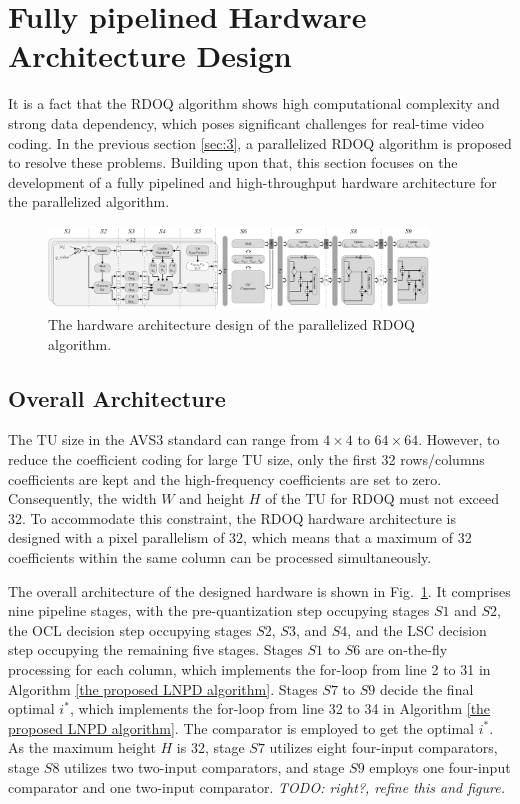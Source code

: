 \documentclass[lettersize,journal]{IEEEtran}
\begin{document}
\section{Fully pipelined Hardware Architecture Design}
It is a fact that the RDOQ algorithm shows high computational complexity and strong data dependency, which poses significant challenges for real-time video coding. In the previous section \ref{sec:3}, a parallelized RDOQ algorithm is proposed to resolve these problems. Building upon that, this section focuses on the development of a fully pipelined and high-throughput hardware architecture for the parallelized algorithm. 
\par
\begin{figure}[htbp]
	\centering
	\centerline{\includegraphics[width=0.90\textwidth]{pic_pan/overall_architecture.png}} 
	\caption{The hardware architecture design of the parallelized RDOQ algorithm.}
	\label{overall_architecture} %
\end{figure}

\subsection{Overall Architecture}
The TU size in the AVS3 standard can range from $4\times4$ to $64\times64$. However, to reduce the coefficient coding for large TU size, only the first 32 rows/columns coefficients are kept and the high-frequency coefficients are set to zero. Consequently, the width $W$ and height $H$ of the TU for RDOQ must not exceed 32. To accommodate this constraint, the RDOQ hardware architecture is designed with a pixel parallelism of 32, which means that a maximum of 32 coefficients within the same column can be processed simultaneously. 

The overall architecture of the designed hardware is shown in Fig.~\ref{overall_architecture}. It comprises nine pipeline stages, with the pre-quantization step occupying stages $S1$ and $S2$, the OCL decision step occupying stages $S2$, $S3$, and $S4$, and the LSC decision step occupying the remaining five stages. Stages $S1$ to $S6$ are on-the-fly processing for each column, which implements the for-loop from line 2 to 31 in Algorithm \ref{the proposed LNPD algorithm}. Stages $S7$ to $S9$ decide the final optimal $i_{}^{*}$, which implements the for-loop from line 32 to 34 in Algorithm \ref{the proposed LNPD algorithm}. The comparator is employed to get the optimal $i_{}^{*}$. As the maximum height $H$ is 32, stage $S7$ utilizes eight four-input comparators, stage $S8$ utilizes two two-input comparators, and stage $S9$ employs one four-input comparator and one two-input comparator. \emph{TODO: right?, refine this and figure.}
\end{document}
